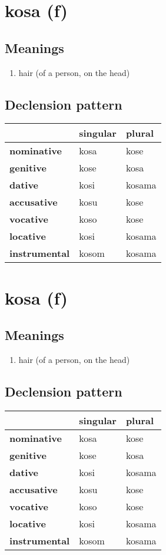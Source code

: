 \filbreak
\section{kosa (f)}
\subsection*{Meanings}
\begin{enumerate}
\item hair (of a person, on the head)
\end{enumerate}
\subsection*{Declension pattern}
\begin{tabularx}{\linewidth}{Xll}
\toprule
{} & singular &  plural \\
\midrule
\textbf{nominative  } &     kosa &    kose \\
\textbf{genitive    } &     kose &    kosa \\
\textbf{dative      } &     kosi &  kosama \\
\textbf{accusative  } &     kosu &    kose \\
\textbf{vocative    } &     koso &    kose \\
\textbf{locative    } &     kosi &  kosama \\
\textbf{instrumental} &    kosom &  kosama \\
\bottomrule
\end{tabularx}

\filbreak
\section{kosa (f)}
\subsection*{Meanings}
\begin{enumerate}
\item hair (of a person, on the head)
\end{enumerate}
\subsection*{Declension pattern}
\begin{tabularx}{\linewidth}{Xll}
\toprule
{} & singular &  plural \\
\midrule
\textbf{nominative  } &     kosa &    kose \\
\textbf{genitive    } &     kose &    kosa \\
\textbf{dative      } &     kosi &  kosama \\
\textbf{accusative  } &     kosu &    kose \\
\textbf{vocative    } &     koso &    kose \\
\textbf{locative    } &     kosi &  kosama \\
\textbf{instrumental} &    kosom &  kosama \\
\bottomrule
\end{tabularx}

